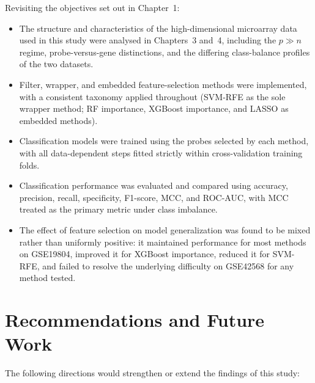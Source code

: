 Revisiting the objectives set out in Chapter~1:
\begin{itemize}
    \item The structure and characteristics of the high-dimensional microarray data used in this study were analysed in Chapters~3 and~4, including the $p \gg n$ regime, probe-versus-gene distinctions, and the differing class-balance profiles of the two datasets.
    \item Filter, wrapper, and embedded feature-selection methods were implemented, with a consistent taxonomy applied throughout (SVM-RFE as the sole wrapper method; RF importance, XGBoost importance, and LASSO as embedded methods).
    \item Classification models were trained using the probes selected by each method, with all data-dependent steps fitted strictly within cross-validation training folds.
    \item Classification performance was evaluated and compared using accuracy, precision, recall, specificity, F1-score, MCC, and ROC-AUC, with MCC treated as the primary metric under class imbalance.
    \item The effect of feature selection on model generalization was found to be mixed rather than uniformly positive: it maintained performance for most methods on GSE19804, improved it for XGBoost importance, reduced it for SVM-RFE, and failed to resolve the underlying difficulty on GSE42568 for any method tested.
\end{itemize}

\section{Recommendations and Future Work}

The following directions would strengthen or extend the findings of this study:

